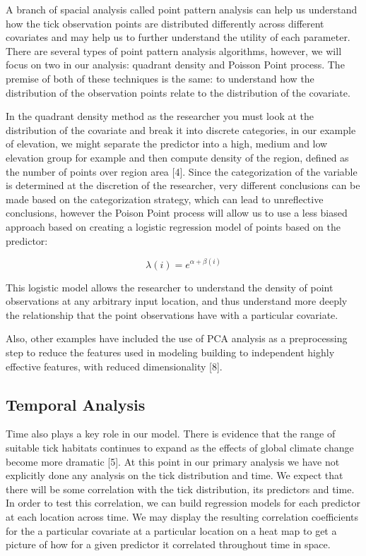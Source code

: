 \noindent A branch of spacial analysis called point pattern analysis can help us understand how the tick observation points are distributed differently across different covariates and may help us to further understand the utility of each parameter. There are several types of point pattern analysis algorithms, however, we will focus on two in our analysis: quadrant density and Poisson Point process. The premise of both of these techniques is the same: to understand how the distribution of the observation points relate to the distribution of the covariate. \newline

\noindent In the quadrant density method as the researcher you must look at the distribution of the covariate and break it into discrete categories, in our example of elevation, we might separate the predictor into a high, medium and low elevation group for example and then compute density of the region, defined as the number of points over region area [4]. Since the categorization of the variable is determined at the discretion of the researcher, very different conclusions can be made based on the categorization strategy, which can lead to unreflective conclusions, however the Poison Point process will allow us to use a less biased approach based on creating a logistic regression model of points based on the predictor:

\begin{equation}
\lambda(i) = e^{\alpha +\beta(i)}
\end{equation}

\noindent This logistic model allows the researcher to understand the density of point observations at any arbitrary input location, and thus understand more deeply the relationship that the point observations have with a particular covariate.\newline

\noindent Also, other examples have included the use of PCA analysis as a preprocessing step to reduce the features used in modeling building to independent highly effective features, with reduced dimensionality [8].   \newline


\subsection{Temporal Analysis}
Time also plays a key role in our model. There is evidence that the range of suitable tick habitats continues to expand as the effects of global climate change become more dramatic [5]. At this point in our primary analysis we have not explicitly done any analysis on the tick distribution and time. We expect that there will be some correlation with the tick distribution, its predictors and time. In order to test this correlation, we can build regression models for each predictor at each location across time. We may display the resulting correlation coefficients for the a particular covariate at a particular location on a heat map to get a picture of how for a given predictor it correlated throughout time in space.  \newline

